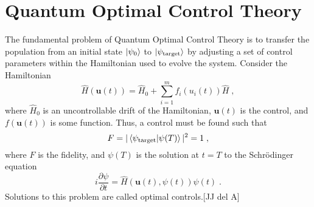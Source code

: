 \chapter{Quantum Optimal Control Theory}


The fundamental problem of Quantum Optimal Control Theory is to transfer the population from an initial state $\ket{\psi_0}$ to $\ket{\psi_{\mathrm{target}}}$ by adjusting a set of control parameters within the Hamiltonian used to evolve the system. Consider the Hamiltonian
\begin{equation}
	\hat{H}(\boldsymbol{u}(t)) = \hat{H}_0 + \sum_{i = 1}^{m} f_i(u_i(t)) \hat{H} \; ,
\end{equation} 
where $\hat{H}_0$ is an uncontrollable drift of the Hamiltonian, $\boldsymbol{u}(t)$ is the control, and $f(\boldsymbol{u}(t))$ is some function. Thus, a control must be found such that 
\begin{equation}
	F = |\braket{\psi_{\mathrm{target}} | \psi (T)}|^2 = 1 \; ,
\end{equation}
where $F$ is the fidelity, and $\psi (T)$ is the solution at $t = T$ to the Schrödinger equation 
\begin{equation}
	i \frac{\partial \psi}{\partial t} = \hat{H} \left( \boldsymbol{u}(t),\psi (t) \right) \psi (t) \; .
\end{equation}
Solutions to this problem are called optimal controls.[JJ del A]


